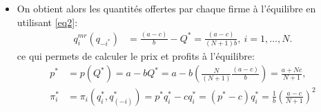 \documentclass[notes, ignorenonframetext, compress, 10pt, xcolor=svgnames, aspectratio=169]{beamer}
\begin{document}
\begin{frame}[allowframebreaks]{\insertsection}
\begin{itemize}
           \item On obtient alors les quantités offertes par chaque firme à l'équilibre en utilisant
            \eqref{eq2}:
            \begin{align*} 
                q_i^{mr}(q_{-i^*}) &= \frac{(a-c)}{b} - Q^* = \frac{(a-c)}{(N+1)b}, \ i=1, \ldots, N.
            \end{align*}
            ce qui permets de calculer le prix et profits à l'équilibre: 
            \begin{align*}
                p^* &=p(Q^*) = a-bQ^* = a-b\left(\frac{N}{(N+1)}\frac{(a-c)}{b}\right)=\frac{a+Nc}{N+1},\\
                \pi_i^* &=\pi_i(q_i^*,q_{(-i)}^*)=p^*q_i^* - cq_i^* = (p^*-c)q_i^* =\frac{1}{b}\left(\frac{a-c}{N+1}\right)^2
            \end{align*}    
    \end{itemize}
\end{frame}
\end{document}
